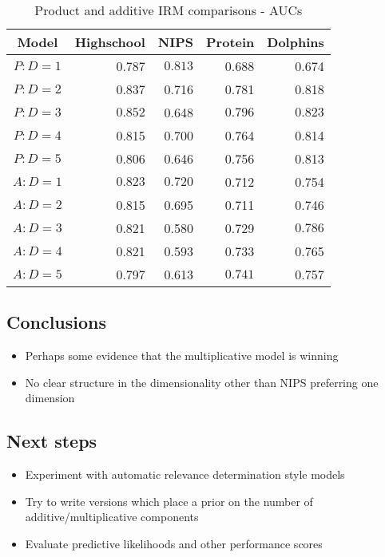 \documentclass[twoside,11pt]{article}
\begin{document}
\begin{table*}[ht!]
\caption{{\small
Product and additive IRM comparisons - AUCs
}}
\label{tbl:Prod Add IRM 11-Mar-2013}
\begin{center}
\begin{tabular}{c | r r r r}
Model & Highschool & NIPS & Protein & Dolphins \\
\hline
$P : D=1$ & 0.787 & $\mathbf{0.813}$ & 0.688 & 0.674 \\
$P : D=2$ & 0.837 & 0.716 & 0.781 & 0.818 \\
$P : D=3$ & $\mathbf{0.852}$ & 0.648 & $\mathbf{0.796}$ & $\mathbf{0.823}$ \\
$P : D=4$ & 0.815 & 0.700 & 0.764 & 0.814 \\
$P : D=5$ & 0.806 & 0.646 & 0.756 & 0.813 \\
\hline
$A : D=1$ & $\mathbf{0.823}$ & $\mathbf{0.720}$ & 0.712 & 0.754 \\
$A : D=2$ & 0.815 & 0.695 & 0.711 & 0.746 \\
$A : D=3$ & 0.821 & 0.580 & 0.729 & $\mathbf{0.786}$ \\
$A : D=4$ & 0.821 & 0.593 & 0.733 & 0.765 \\
$A : D=5$ & 0.797 & 0.613 & $\mathbf{0.741}$ & 0.757 \\
\end{tabular}
\end{center}
\end{table*}

\subsection{Conclusions}

\begin{itemize}
\item Perhaps some evidence that the multiplicative model is winning
\item No clear structure in the dimensionality other than NIPS preferring one dimension
\end{itemize}

\subsection{Next steps}

\begin{itemize}
\item Experiment with automatic relevance determination style models
\item Try to write versions which place a prior on the number of additive/multiplicative components
\item Evaluate predictive likelihoods and other performance scores
\end{itemize}
\end{document}
